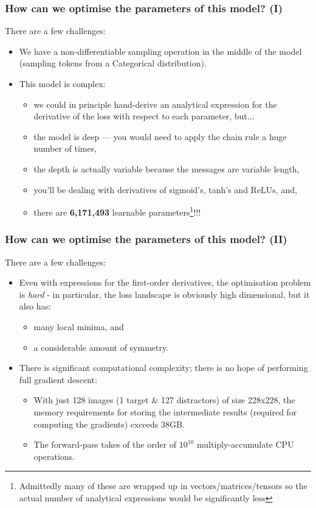 \documentclass[\beamerclass,aspectratio=1610]{beamer}
\begin{document}
\begin{frame}
\frametitle{How can we optimise the parameters of this model? (I)}
There are a few challenges:

\begin{itemize}
	\item We have a non-differentiable sampling operation in the middle of the model (sampling tokens from a Categorical distribution). \pause
	\item This model is complex:
	\begin{itemize}
		\item we could in principle hand-derive an analytical expression for the derivative of the loss with respect to each parameter, but...
		\item the model is deep --- you would need to apply the chain rule a huge number of times, 
		\item the depth is actually variable because the messages are variable length,
		\item you'll be dealing with derivatives of sigmoid's, tanh's and ReLUs, and,
		\item there are \textbf{6,171,493} learnable parameters\footnote{Admittedly many of these are wrapped up in vectors/matrices/tensors so the actual number of analytical expressions would be significantly less}!!!
	\end{itemize}
\end{itemize}	
\end{frame}
\begin{frame}
\frametitle{How can we optimise the parameters of this model? (II)}
There are a few challenges:

\begin{itemize}
	\item Even with expressions for the first-order derivatives, the optimisation problem is \textit{hard} - in particular, the loss landscape is obviously high dimensional, but it also has:
	\begin{itemize}
		\item many local minima, and
		\item a considerable amount of symmetry.
	\end{itemize}\pause
	\item There is significant computational complexity; there is no hope of performing full gradient descent:
	\begin{itemize}
		\item With just 128 images (1 target \& 127 distractors) of size 228x228, the memory requirements for storing the intermediate results (required for computing the gradients) exceeds 38GB.
		\item The forward-pass takes of the order of $10^{10}$ multiply-accumulate CPU operations.
	\end{itemize}
\end{itemize}
\end{frame}
\end{document}
